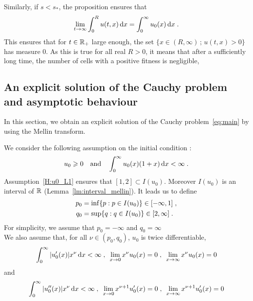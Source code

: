         Similarly, if $s<s_*$, the proposition ensures that 
        \begin{align*}
            \lim_{t \to \infty} \int_0^R u(t,x) \,\mathrm{d} x = \int_0^\infty u_0(x) \,\mathrm{d} x \; .
        \end{align*}
        This ensures that for $t \in \mathbb{R}_+$ large enough, the set $\{ x \in (R, \infty) \,;\, u(t,x) > 0\}$ has measure $0$. As this is true for all real $R > 0$, it means that after a sufficiently long time, the number of cells with a positive fitness is negligible, %


    \subsection{An explicit solution of the Cauchy problem and asymptotic behaviour}
    \label{s:explicit}
    In this section, we obtain an explicit solution of the Cauchy problem~\eqref{eq:main} by using the Mellin transform.
    
    We consider the following assumption on the initial condition : 
    \begin{equation}
    u_0 \geqslant 0 \quad \text{and} \quad \int_0^\infty u_0(x) (1+x) \, \mathrm dx < \infty
    \; .
    \end{equation}
Assumption~\eqref{H:u0_L1} ensures that $[1, 2] \subset I(u_0)$. Moreover $I(u_0)$ is an interval of $\mathbb{R}$ (Lemma~\ref{lm:interval_mellin}). It leads us to define
\begin{subequations}
\begin{align*}
    p_0 &= \inf \{p : p \in I(u_0) \} \in [-\infty, 1] \; ,\\
    q_0 &= \sup \{q : q \in I(u_0) \} \in [2, \infty] \; .
\end{align*}    
\end{subequations}
For simplicity, we assume that 
$ p_0=-\infty$ and $q_0 = \infty$ \\

We also assume that, for all $\nu \in (p_0, q_0)$, $u_0$ is twice differentiable, 
\begin{equation}
    \int_0^\infty |u_0'(x)| x^\nu \, \mathrm dx < \infty
    \; , \enspace
    \lim_{x \to 0} x^\nu u_0(x) = 0
    \; , \enspace
    \lim_{x \to \infty} x^\nu u_0(x) = 0
    \label{H:DoumicEsco22}
\end{equation}
and 
\begin{equation}
    \int_0^\infty |u_0''(x)| x^\nu \, \mathrm dx < \infty
    \; , \enspace
    \lim_{x \to 0} x^{\nu + 1} u_0'(x) = 0
    \; , \enspace
    \lim_{x \to \infty} x^{\nu + 1} u_0'(x) = 0
    \label{H:DoumicEsco23}
\end{equation}

